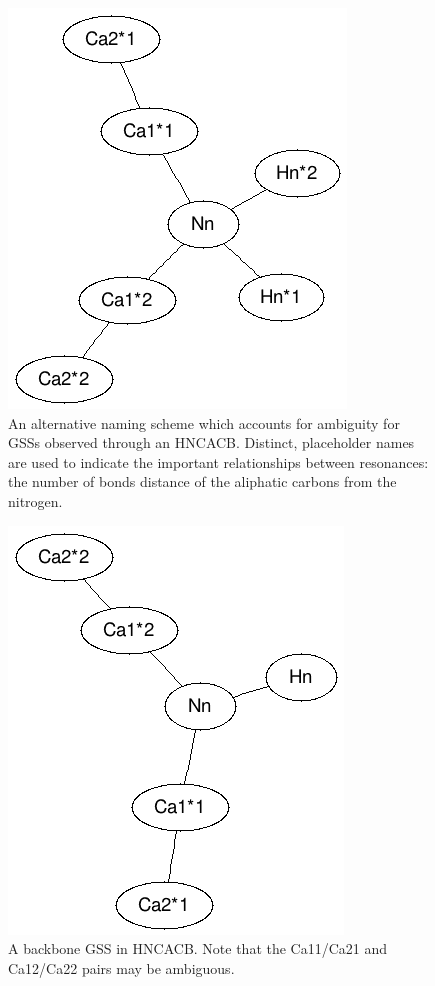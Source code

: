 \begin{figure}
  \includegraphics[scale=0.75]{figures/generic_hncacb_ambiguous}
  \caption[An alternative naming scheme which accounts for ambiguity.]
          {An alternative naming scheme which accounts for ambiguity for
           GSSs observed through an HNCACB.  Distinct, placeholder names are
           used to indicate the important relationships between resonances:
           the number of bonds distance of the aliphatic carbons from the
           nitrogen.}
  \label{generic_hncacb_ambiguous}
\end{figure}

\begin{figure}
  \includegraphics[scale=0.75]{figures/backbone_hncacb_ambiguous}
  \caption[A backbone GSS in HNCACB.]
          {A backbone GSS in HNCACB.  Note that 
           the Ca11/Ca21 and Ca12/Ca22 pairs may be ambiguous.}
  \label{backbone_hncacb_ambiguous}
\end{figure}


